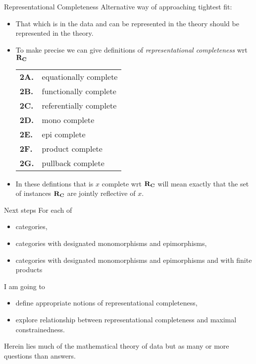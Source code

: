 \begin{frame}{Representational Completeness}
Alternative way of approaching tightest fit:
\begin{itemize}
\item That which is in the data and can be represented in the theory should be represented in the theory.
\item To make precise we can give definitions
 of \textit{representational completeness} wrt $\textbf{R}_{\textbf{C}}$ 
\begin{center}
\begin{tabular}{>{\bfseries}l l} 
2A. & equationally complete   \\
2B. & functionally complete   \\
2C. & referentially complete  \\
2D. & mono complete           \\
2E. & epi complete            \\
2F. & product complete        \\
2G. & pullback complete       \\
\end{tabular}
\end{center}
\pause \item In these defintions that \catcw is $x$ complete wrt $\textbf{R}_{\textbf{C}}$ will mean exactly that the set of instances $\textbf{R}_{\textbf{C}}$ are jointly reflective of $x$.
\end{itemize}
\end{frame}

\begin{frame}{Next steps}
For each of
\begin{itemize}
\item categories,
\item categories with designated monomorphisms and epimorphisms,
\item categories with designated monomorphisms and epimorphisms and with finite products
\end{itemize}
\medskip
I am going to
\begin{itemize}
\item define appropriate notions of representational completeness,
\item explore relationship between representational completeness and maximal constrainedness.
\end{itemize}

Herein lies much of the mathematical theory of data but as many or more questions than answers.
\end{frame}

